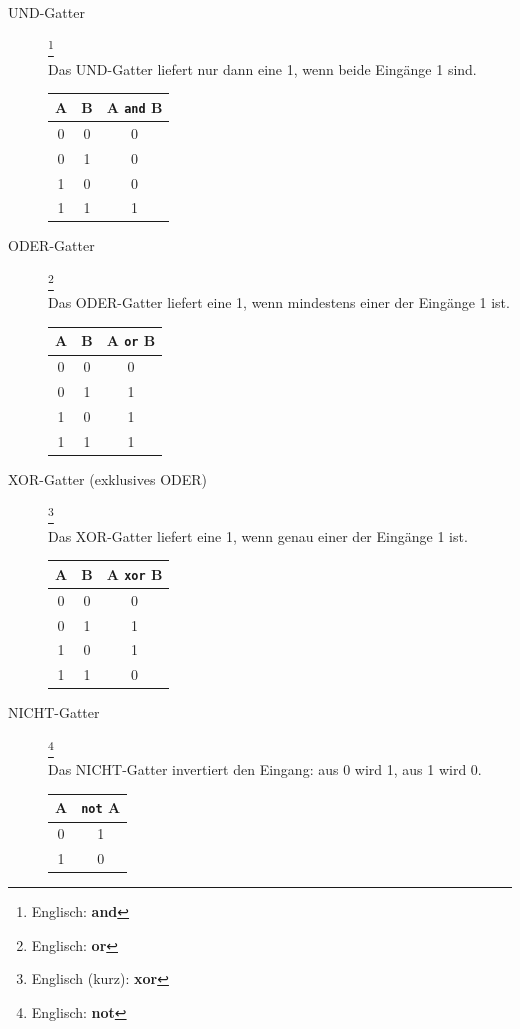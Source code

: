 \begin{description}
  \item[UND-Gatter]\footnote{Englisch: \textbf{and}}\hfill\\
    Das UND-Gatter liefert nur dann eine 1, wenn beide Eingänge 1 sind.
    \begin{center}
    \begin{tabular}{c|c|c}
    A & B & A \texttt{and} B \\
    \hline
    0 & 0 & 0 \\
    0 & 1 & 0 \\
    1 & 0 & 0 \\
    1 & 1 & 1 \\
    \end{tabular}
    \end{center}

  \item[ODER-Gatter]\footnote{Englisch: \textbf{or}}\hfill\\
    Das ODER-Gatter liefert eine 1, wenn mindestens einer der Eingänge 1 ist.
    \begin{center}
    \begin{tabular}{c|c|c}
    A & B & A \texttt{or} B \\
    \hline
    0 & 0 & 0 \\
    0 & 1 & 1 \\
    1 & 0 & 1 \\
    1 & 1 & 1 \\
    \end{tabular}
    \end{center}

  \item[XOR-Gatter (exklusives ODER)]\footnote{Englisch (kurz): \textbf{xor}}\hfill\\
    Das XOR-Gatter liefert eine 1, wenn genau einer der Eingänge 1 ist.
    \begin{center}
    \begin{tabular}{c|c|c}
    A & B & A \texttt{xor} B \\
    \hline
    0 & 0 & 0 \\
    0 & 1 & 1 \\
    1 & 0 & 1 \\
    1 & 1 & 0 \\
    \end{tabular}
    \end{center}

  \item[NICHT-Gatter]\footnote{Englisch: \textbf{not}}\hfill\\
    Das NICHT-Gatter invertiert den Eingang: aus 0 wird 1, aus 1 wird 0.
    \begin{center}
    \begin{tabular}{c|c}
    A & \texttt{not} A \\
    \hline
    0 & 1 \\
    1 & 0 \\
    \end{tabular}
    \end{center}
\end{description}

